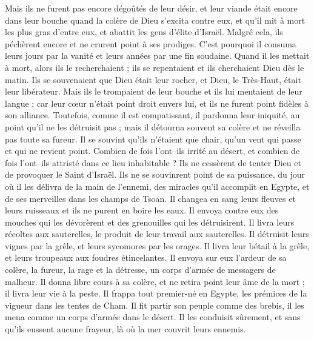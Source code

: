 \begin{multicols}{2}
Mais ils ne furent pas encore dégoûtés de leur désir, et leur viande était encore dans leur bouche
quand la colère de Dieu s'excita contre eux, et qu'il mit à mort les plus gras d'entre eux, et abattit les gens d'élite d'Israël.
Malgré cela, ils péchèrent encore et ne crurent point à ses prodiges.
C'est pourquoi il consuma leurs jours par la vanité et leurs années par une fin soudaine.
Quand il les mettait à mort, alors ils le recherchaient ; ils se repentaient et ils cherchaient Dieu dès le matin.
Ils se souvenaient que Dieu était leur rocher, et Dieu, le Très-Haut, était leur libérateur.
Mais ils le trompaient de leur bouche et ils lui mentaient de leur langue ;
car leur cœur n'était point droit envers lui, et ils ne furent point fidèles à son alliance.
Toutefois, comme il est compatissant, il pardonna leur iniquité, au point qu'il ne les détruisit pas ; mais il détourna souvent sa colère et ne réveilla pas toute sa fureur.
Il se souvint qu'ils n'étaient que chair, qu'un vent qui passe et qui ne revient point.
Combien de fois l'ont–ils irrité au désert, et combien de fois l'ont–ils attristé dans ce lieu inhabitable ?
Ils ne cessèrent de tenter Dieu et de provoquer le Saint d'Israël.
Ils ne se souvinrent point de sa puissance, du jour où il les délivra de la main de l'ennemi,
des miracles qu'il accomplit en Egypte, et de ses merveilles dans les champs de Tsoan.
Il changea en sang leurs fleuves et leurs ruisseaux et ils ne purent en boire les eaux.
Il envoya contre eux des mouches qui les dévorèrent et des grenouilles qui les détruisirent.
Il livra leurs récoltes aux sauterelles, le produit de leur travail aux sauterelles.
Il détruisit leurs vignes par la grêle, et leurs sycomores par les orages.
Il livra leur bétail à la grêle, et leurs troupeaux aux foudres étincelantes.
Il envoya sur eux l'ardeur de sa colère, la fureur, la rage et la détresse, un corps d'armée de messagers de malheur.
Il donna libre cours à sa colère, et ne retira point leur âme de la mort ; il livra leur vie à la peste.
Il frappa tout premier-né en Egypte, les prémices de la vigueur dans les tentes de Cham.
Il fit partir son peuple comme des brebis, il les mena comme un corps d'armée dans le désert.
Il les conduisit sûrement, et sans qu'ils eussent aucune frayeur, là où la mer couvrit leurs ennemis.

\end{multicols}
